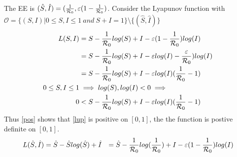 The EE is $(\hat{S},\hat{I}) = (\frac{1}{{\mathcal R_0}},\varepsilon(1-\frac{1}{{\mathcal R_0}})$.
Consider the Lyapunov function with ${\mathcal O} = \{(S,I) | 0\leq S,I \leq 1\ and\ S+I = 1\} \setminus \{(\hat{S},\hat{I})\}$
\begin{align}
    L(S,I) &= S - \frac{1}{{\mathcal R_0}}log(S) + I - \varepsilon(1-\frac{1}{{\mathcal R_0}})log(I)\nonumber\\
           &= S - \frac{1}{{\mathcal R_0}}log(S) + I - \varepsilon log(I) -\frac{\varepsilon}{{\mathcal R_0}})log(I)\nonumber\\
           &= S - \frac{1}{{\mathcal R_0}}log(S) + I - \varepsilon log(I) (\frac{1}{{\mathcal R_0}}-1)\label{lup}\\
    0 \leq S,I \leq 1 &\implies log(S), log(I) < 0 \implies \nonumber\\
    0   &< S - \frac{1}{{\mathcal R_0}}log(S) + I - \varepsilon log(I) (\frac{1}{{\mathcal R_0}}-1)\label{pos}
\end{align}
Thus \ref{pos} shows that \ref{lup} is positive on $[0,1]$, the the function is postive definite on $[0,1]$.
\begin{align}
    L(\hat{S},\hat{I})  &= \hat{S} - \hat{S}log(\hat{S}) + \hat{I}
    &= \hat{S} - \frac{1}{{\mathcal R_0}}log(\frac{1}{{\mathcal R_0}}) + I - \varepsilon(1-\frac{1}{{\mathcal R_0}})log(I)\label{lupeq}\\
\end{align}
